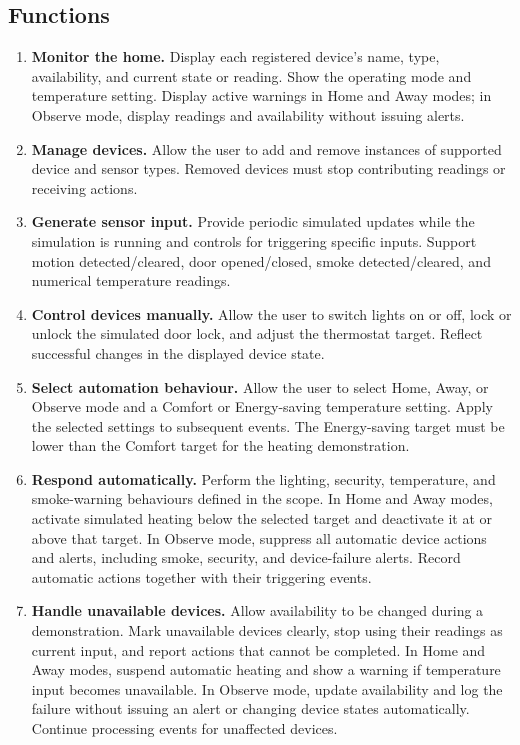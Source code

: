 \documentclass[12pt,letterpaper]{report}
\begin{document}
\subsection{Functions}
\begin{enumerate}[label=\textbf{F\arabic*.},leftmargin=*]
  \item \textbf{Monitor the home.} Display each registered device's name, type, availability, and current state or reading. Show the operating mode and temperature setting. Display active warnings in Home and Away modes; in Observe mode, display readings and availability without issuing alerts.
  \item \textbf{Manage devices.} Allow the user to add and remove instances of supported device and sensor types. Removed devices must stop contributing readings or receiving actions.
  \item \textbf{Generate sensor input.} Provide periodic simulated updates while the simulation is running and controls for triggering specific inputs. Support motion detected/cleared, door opened/closed, smoke detected/cleared, and numerical temperature readings.
  \item \textbf{Control devices manually.} Allow the user to switch lights on or off, lock or unlock the simulated door lock, and adjust the thermostat target. Reflect successful changes in the displayed device state.
  \item \textbf{Select automation behaviour.} Allow the user to select Home, Away, or Observe mode and a Comfort or Energy-saving temperature setting. Apply the selected settings to subsequent events. The Energy-saving target must be lower than the Comfort target for the heating demonstration.
  \item \textbf{Respond automatically.} Perform the lighting, security, temperature, and smoke-warning behaviours defined in the scope. In Home and Away modes, activate simulated heating below the selected target and deactivate it at or above that target. In Observe mode, suppress all automatic device actions and alerts, including smoke, security, and device-failure alerts. Record automatic actions together with their triggering events.
  \item \textbf{Handle unavailable devices.} Allow availability to be changed during a demonstration. Mark unavailable devices clearly, stop using their readings as current input, and report actions that cannot be completed. In Home and Away modes, suspend automatic heating and show a warning if temperature input becomes unavailable. In Observe mode, update availability and log the failure without issuing an alert or changing device states automatically. Continue processing events for unaffected devices.

\end{enumerate}
\end{document}
